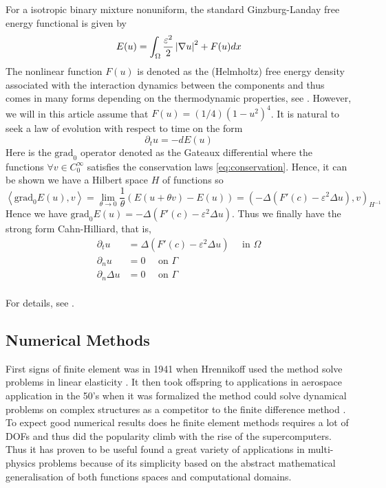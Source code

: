 For a isotropic
binary mixture nonuniform, the standard Ginzburg-Landay free energy functional is given by \[
E( u)  = \int_{\Omega }^{} \frac{\varepsilon ^2}{2} \left\lvert  \nabla u  \right\rvert ^2 + F( u) dx
\]
The nonlinear function $F( u) $ is denoted as the (Helmholtz) free energy density associated with the interaction dynamics between the components and thus comes in many forms depending on the thermodynamic properties, see \cite{miranville2017cahn}.
However, we will in this article assume that $F( u) = ( 1 / 4 ) ( 1- u^2) ^{4} $.
It is natural to seek a law of evolution with respect to time on the form \[
\partial _{t} u = - d E( u)
\]
Here is the $\text{grad}_{0}$  operator denoted as the Gateaux differential where the functions $\forall v \in  C^{\infty}_{0}$ satisfies the conservation laws \eqref{eq:conservation}. Hence, it can be shown we have a Hilbert space $H$ of functions so \[
\left< \text{grad}_{0} E( u) , v \right> = \lim_{\theta \to 0} \frac{1}{\theta } ( E( u + \theta  v) - E( u)  ) = ( -\Delta ( F'( c) - \varepsilon ^2 \Delta u ), v )_{H^{-1}}
\]
Hence we have $\text{grad}_{0} E( u) =  -\Delta ( F'( c) - \varepsilon ^2 \Delta u ) $. Thus we finally have the strong form Cahn-Hilliard, that is, \[
    \begin{split}
\partial _{t} u & = \Delta ( F'( c) - \varepsilon ^2 \Delta u ) \quad \text{ in } \Omega  \\
\partial _{n} u &= 0 \quad \text{ on } \Gamma  \\
\partial _{n} \Delta u &= 0 \quad \text{ on } \Gamma  \\
    \end{split}
\]

For details, see \cite[Ch 3. Mathematical derivation]{lee2014physical}.





\subsection{Numerical Methods}%
\label{sub:numerical_methods}


First signs of finite element was in 1941 when Hrennikoff used the method solve problems in linear elasticity \cite{hrennikoff1941solution}. It then took offspring to applications in aerospace application in the 50's when it was formalized the method
could solve dynamical problems on complex structures as a competitor to the finite difference method
\cite{argyris1960energy, turner1956stiffness, liu2022eighty}. To expect good numerical results does he finite element methods requires a lot of DOFs and thus did the popularity climb with the rise of the supercomputers. Thus it has proven to be
useful found a great variety of applications in multi-physics problems because of its simplicity based on the abstract mathematical generalisation of both functions spaces and computational domains.

